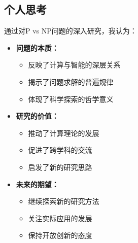 \documentclass[a4paper,12pt]{ctexart}
\begin{document}
\subsection{个人思考}
通过对P vs NP问题的深入研究，我认为：
\begin{itemize}
    \item \textbf{问题的本质：}
        \begin{itemize}
            \item 反映了计算与智能的深层关系
            \item 揭示了问题求解的普遍规律
            \item 体现了科学探索的哲学意义
        \end{itemize}
    \item \textbf{研究的价值：}
        \begin{itemize}
            \item 推动了计算理论的发展
            \item 促进了跨学科的交流
            \item 启发了新的研究思路
        \end{itemize}
    \item \textbf{未来的期望：}
        \begin{itemize}
            \item 继续探索新的研究方法
            \item 关注实际应用的发展
            \item 保持开放创新的态度
        \end{itemize}
\end{itemize}
\end{document}
